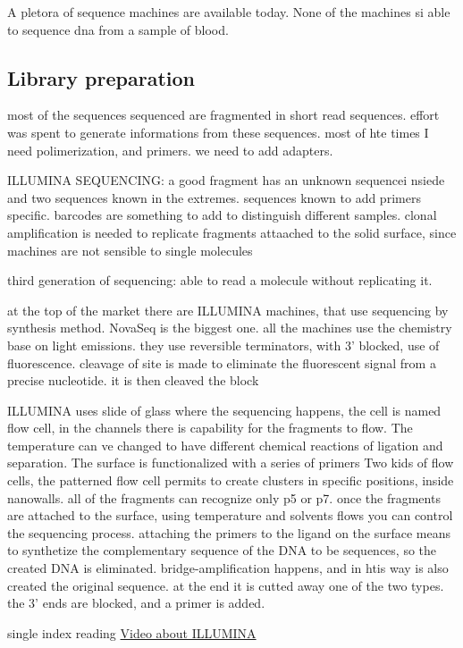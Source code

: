 A pletora of sequence machines are available today. None of the machines si able to sequence dna from a sample of blood. 

\subsection{Library preparation}
most of the sequences sequenced are fragmented in short read sequences. effort was spent to generate informations from these sequences.  most of hte times I need polimerization, and primers. we need to add adapters. 

ILLUMINA SEQUENCING:
a good fragment has an unknown sequencei nsiede and two sequences known in the extremes. sequences known to add primers specific. barcodes are something to add to distinguish different samples. clonal amplification is needed to replicate fragments attaached to the solid surface, since machines are not sensible to single molecules


third generation of sequencing: able to read a molecule without replicating it.

at the top of the market there are ILLUMINA machines, that use sequencing by synthesis method. NovaSeq is the biggest one. all the machines use the chemistry base on light emissions. they use reversible terminators, with 3' blocked, use of fluorescence. cleavage of site is made to eliminate the fluorescent signal from a precise nucleotide.  it is then cleaved the block

ILLUMINA uses slide of glass where the sequencing happens, the cell is named flow cell, in the channels there is capability for the fragments to flow. The temperature can ve changed to have different chemical reactions of ligation and separation. The surface is functionalized with a series of primers
Two kids of flow cells, the patterned flow cell permits to create clusters in specific positions, inside nanowalls. all of the fragments can recognize only p5 or p7. once the fragments are attached to the surface, using temperature and solvents flows you can control the sequencing process. attaching the primers to the ligand on the surface means to synthetize the complementary sequence of the DNA to be sequences, so the created DNA is eliminated. bridge-amplification happens, and in htis way is also created the original sequence. at the end it is cutted away one of the two types. the 3' ends are blocked, and a primer is added. 

single index reading
\href{https://www.youtube.com/watch?v=womKfikWlxM}{Video about ILLUMINA}

